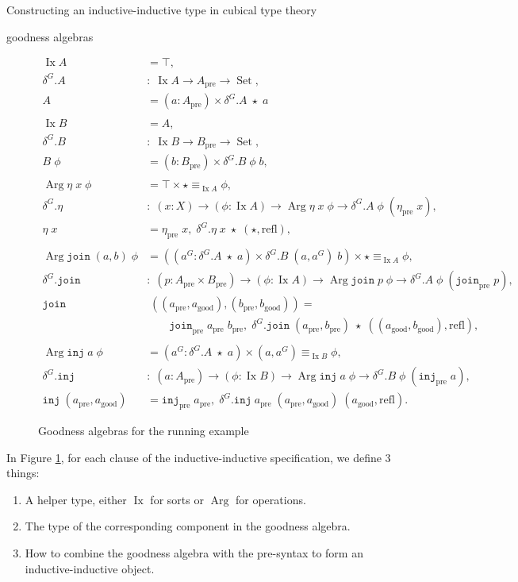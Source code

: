\documentclass[acmsmall,review]{acmart}\settopmatter{printfolios=true,printccs=false,printacmref=false}
\DeclareMathOperator{\USet}{Set}
\DeclareMathOperator{\Arg}{Arg}
\DeclareMathOperator{\Ix}{Ix}
\newcommand{\pre}[1]{{#1}_\text{pre}}
\newcommand{\good}[1]{{#1}_\text{good}}
\newcommand{\IdA}[3]{{#1}\equiv_{#3}{#2}}
\newcommand{\join}{\texttt{join}}
\newcommand{\inj}{\texttt{inj}}
\begin{document}
\begin{section}{Constructing an inductive-inductive type in cubical type theory}
\begin{subsection}{goodness algebras}
\begin{figure}[htpb]
\begin{flushleft}
\begin{align*}
\Ix A &= \top,\\
\delta^G.A &:\; \Ix A \to \pre{A} \to \USet,\\
A &= (a : \pre{A}) \times \delta^G.A\;\star\;a\\
\\
\Ix B &= A,\\
\delta^G.B &:\; \Ix B \to \pre{B} \to \USet,\\
B\;\phi &= (b : \pre{B}) \times \delta^G.B\;\phi\;b,\\
\\
\Arg \eta\;x\;\phi &= \top \times \IdA{\star}{\phi}{\Ix A},\\
\delta^G.\eta &:\; (x : X) \to (\phi : \Ix A) \to \Arg \eta \;x\;\phi \to \delta^G.A\;\phi\;(\pre{\eta}\;x),\\
\eta\;x &= \pre{\eta}\;x,\; \delta^G.\eta\;x\;\star\;(\star,\text{refl}),\\
\\
\Arg \join\;(a,b)\;\phi &= ((a^G : \delta^G.A\;\star\;a) \times \delta^G.B\;(a,a^G)\;b) \times\IdA{\star}{\phi}{\Ix A},\\
\delta^G.\join &:\; (p : \pre{A} \times \pre{B}) \to (\phi : \Ix A) \to \Arg\join\;p\;\phi \to \delta^G.A\;\phi\;(\pre{\join}\;p),\\
\join&\;((\pre{a}, \good{a}), (\pre{b}, \good{b})) =\\&\qquad\pre{\join}\;\pre{a}\;\pre{b},\; \delta^G.\join\;(\pre{a}, \pre{b})\;\star\;((\good{a}, \good{b}),\text{refl}),\\
\\
\Arg \inj\;a\;\phi &= (a^G : \delta^G.A\;\star\;a) \times \IdA{(a , a^G)}{\phi}{\Ix B},\\
\delta^G.\inj &:\; (a : \pre{A}) \to (\phi : \Ix B) \to \Arg\inj\;a\;\phi \to \delta^G.B\;\phi\;(\pre{\inj}\;a),\\
\inj\;(\pre{a}, \good{a}) &= \pre{\inj}\;\pre{a},\; \delta^G.\inj\;\pre{a}\;(\pre{a}, \good{a})\;(\good{a}, \text{refl}).
\end{align*}

\caption{\label{example-goodness-algebra-def}Goodness algebras for the running example}
\end{flushleft}\end{figure}

In Figure \ref{example-goodness-algebra-def}, for each clause of the inductive-inductive specification, we define 3 things:
\begin{enumerate}
    \item A helper type, either $\Ix$ for sorts or $\Arg$ for operations.
    \item The type of the corresponding component in the goodness algebra.
    \item How to combine the goodness algebra with the pre-syntax to form an inductive-inductive object.
\end{enumerate}


\end{subsection}
\end{section}
\end{document}
